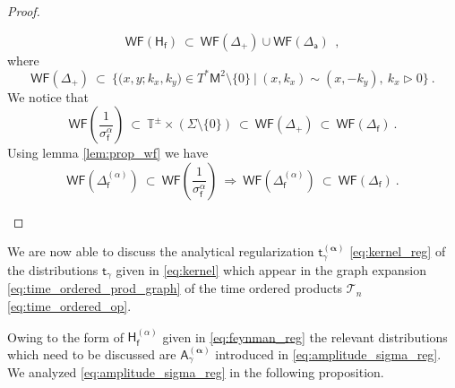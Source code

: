 \documentclass[11pt]{book}
\newcommand{\WF}{\mathsf{WF}}
\newcommand{\alphabd}{\boldsymbol{\alpha}}
\newcommand{\Tcal}{\mathcal{T}}
\newcommand{\Tbb}{\mathbb{T}}
\newcommand{\Asf}{\mathsf{A}}
\newcommand{\Hsf}{\mathsf{H}}
\newcommand{\Msf}{\mathsf{M}}
\newcommand{\asf}{\mathsf{a}}
\newcommand{\fsf}{\mathsf{f}}
\newcommand{\tsf}{\mathsf{t}}
\theoremstyle{break}
\begin{document}
\begin{proof}
\begin{description}
%
\begin{equation*}
\WF(\Hsf_\fsf) \ \subset \ \WF(\Delta_+) \cup \WF(\Delta_\asf) \ \ , 
\end{equation*}
%
where
%
\begin{equation*}
\WF(\Delta_+) \ \subset \ \bigg\{ \bigg( x, y ; k_x, k_y \bigg) \in T^\ast\Msf^2 \setminus \{0\} \ \bigg| \ (x,k_x) \sim (x,-k_y), \ k_x \triangleright 0 \bigg\} \ .
\end{equation*}
% 
We notice that 
%
\begin{equation*}
\WF\left(\frac{1}{\sigma_\fsf^\alpha}\right) 
\ \subset \ 
\Tbb^\pm \times \left( \Sigma \setminus \{0\} \right) 
\ \subset \
\WF(\Delta_+)
\ \subset \
\WF(\Delta_\fsf) \ .
\end{equation*}
%
Using lemma \ref{lem:prop_wf} we have
%
\begin{equation*}
\WF(\Delta_\fsf^{(\alpha)}) 
\ \subset \ 
\WF\left(\frac{1}{\sigma_\fsf^\alpha}\right)
\ \Longrightarrow \
\WF(\Delta_\fsf^{(\alpha)}) 
\ \subset \ 
\WF(\Delta_\fsf) \ .
\end{equation*}
%
\end{description}
\end{proof}


We are now able to discuss the analytical regularization $\tsf^{(\alphabd)}_\gamma$ \eqref{eq:kernel_reg} of the distributions $\tsf_\gamma$ given in \eqref{eq:kernel} which appear in the graph expansion \eqref{eq:time_ordered_prod_graph} of the time ordered products $\Tcal_n$ \eqref{eq:time_ordered_op}. 


Owing to the form of $\Hsf^{(\alpha)}_\fsf$ given in \eqref{eq:feynman_reg} the relevant distributions which need to be discussed are $\Asf^{(\alphabd)}_\gamma$ introduced in \eqref{eq:amplitude_sigma_reg}. We analyzed \eqref{eq:amplitude_sigma_reg} in the following proposition.
\end{document}
